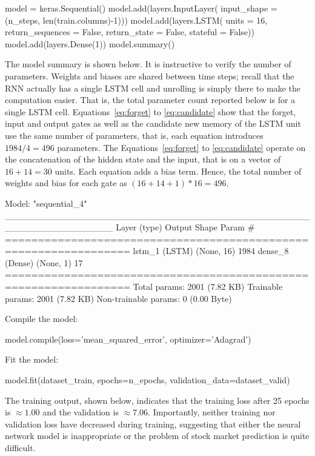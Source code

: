 \begin{withcode}
\begin{pythoncode}
model = keras.Sequential()
model.add(layers.InputLayer(
    input_shape = (n_steps, len(train.columns)-1)))
model.add(layers.LSTM(
    units = 16,
    return_sequences = False,
    return_state = False,
    stateful = False))
model.add(layers.Dense(1))
model.summary()
\end{pythoncode}

The model summary is shown below. It is instructive to verify the number of parameters. Weights and biases are shared between time steps; recall that the RNN actually has a single LSTM cell and unrolling is simply there to make the computation easier. That is, the total parameter count reported below is for a single LSTM cell. Equations~\ref{eq:forget} to \ref{eq:candidate} show that the forget, input and output gates as well as the candidate new memory of the LSTM unit use the same number of parameters, that is, each equation introduces $1984/4 = 496$ parameters. The Equations~\ref{eq:forget} to \ref{eq:candidate} operate on the concatenation of the hidden state and the input, that is on a vector of $16 + 14 = 30$ units. Each equation adds a bias term. Hence, the total number of weights and bias for each gate as $(16 + 14 + 1) * 16 = 496$.

\begin{textcode}
Model: "sequential_4"
_________________________________________________________________
 Layer (type)                Output Shape              Param #   
=================================================================
 lstm_1 (LSTM)               (None, 16)                1984      
 dense_8 (Dense)             (None, 1)                 17        
=================================================================
Total params: 2001 (7.82 KB)
Trainable params: 2001 (7.82 KB)
Non-trainable params: 0 (0.00 Byte)
\end{textcode}

Compile the model:
\begin{pythoncode}
model.compile(loss='mean_squared_error', 
              optimizer='Adagrad')
\end{pythoncode}

Fit the model:
\begin{pythoncode}
model.fit(dataset_train, epochs=n_epochs,
          validation_data=dataset_valid)
\end{pythoncode}

The training output, shown below, indicates that the training loss after 25 epochs is $\approx 1.00$ and the validation is $\approx 7.06$. Importantly, neither training nor validation loss have decreased during training, suggesting that either the neural network model is inappropriate or the problem of stock market prediction is quite difficult.


\end{withcode}
